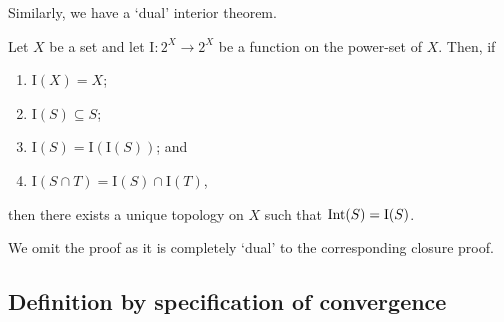 Similarly, we have a `dual' interior theorem.
\begin{thm}\label{KuratowskisInteriorTheorem}
Let $X$ be a set and let $\mathrm{I}:2^X\rightarrow 2^X$ be a function on the power-set of $X$.  Then, if
\begin{enumerate}
\item $\mathrm{I}(X)=X$;
\item $\mathrm{I}(S)\subseteq S$;
\item $\mathrm{I}(S)=\mathrm{I}\left( \mathrm{I}(S)\right)$; and
\item $\mathrm{I}(S\cap T)=\mathrm{I}(S)\cap \mathrm{I}(T)$,
\end{enumerate}
then there exists a unique topology on $X$ such that $\operatorname{Int} (S)=\mathrm{I}(S)$.
\begin{rmk}
We omit the proof as it is completely `dual' to the corresponding closure proof.
\end{rmk}
\end{thm}

\subsection{Definition by specification of convergence}

